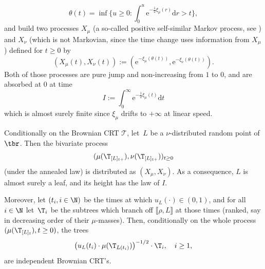 \begin{equation}\label{eq:timechange}\theta(t)=\inf\biggl\{u\geq 0: \int_0^u \mathrm{e}^{-\frac12 \xi_{\mu}(r)}\mathrm d r > t\biggr\},\end{equation}
and build two processes $X_\mu$ (a so-called positive self-similar Markov process, see \cite{Lamp62}) and $X_\nu$ (which is not Markovian, since the time change uses information from $X_\mu$) defined for $t\geq0$ by
\begin{equation}
(X_{\mu}(t),X_\nu(t)):=(\mathrm{e}^{-\xi_\mu(\theta(t))},\mathrm{e}^{-\xi_\nu(\theta(t))}). \label{eq:lamperti}\end{equation}
Both of those processes are pure jump and non-increasing from $1$ to $0$, and are absorbed at $0$ at time \begin{equation} \label{def:I} I:=\int_{0}^{\infty}\mathrm{e}^{-\frac12 \xi_\mu(t)}\mathrm{d}t\end{equation} which is almost surely finite since $ \xi_\mu$ drifts to $+\infty$ at linear speed.

\begin{thm}\label{thm:spinedec} Conditionally on the Brownian CRT $ \mathcal{T}$, let~$L$ be a $\nu$-distributed random point of $\tbr$. Then the bivariate process
\[
(\mu(\T_{[L]_{t+}}),\nu(\T_{[L]_{t+}}))_{t\geq 0}
\]
(under the annealed law) is distributed as $(X_{\mu},X_{\nu})$.
As a consequence, $L$ is almost surely a leaf, and its height has the law of $I$.

Moreover, let $(t_i,i\in\N)$ be the times at which $u_L(\cdot) \in (0,1)$, and for all $i\in \N$ let~$\T_i$ be the subtrees which branch off $\llbracket \rho,L\rrbracket$ at those times (ranked, say in decreasing order of their $\mu$-masses). Then, conditionally on the whole process $(\mu(\T_{[L]_{t}}),t\geq 0)$, the trees
\[
\big(u_L(t_i) \cdot \mu(\T_{L(t_i)}) \big)^{-1/2} \cdot \T_i, \quad i \geq 1,
\]
are independent Brownian CRT's.
\end{thm}

